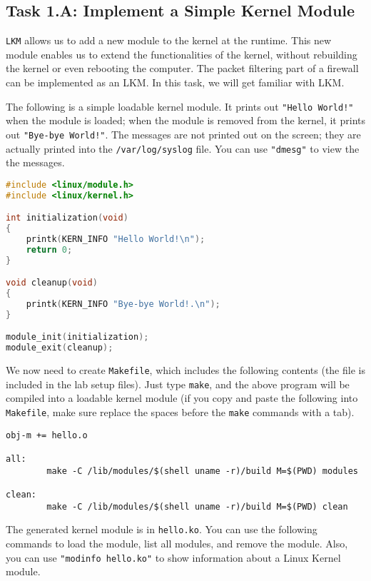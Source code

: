 \subsection{Task 1.A: Implement a Simple Kernel Module}


{\tt LKM} allows us to add a new module to the kernel at the runtime. 
This new module enables us to extend the functionalities of the kernel,
without rebuilding the kernel or even rebooting the computer. 
The packet filtering part of a firewall can be implemented as an LKM. 
In this task, we will get familiar with LKM.


The following is a simple loadable kernel module. It prints out 
\texttt{"Hello World!"} when the module is loaded; when the module
is removed from the kernel, it prints out \texttt{"Bye-bye World!"}.
The messages are not printed out on the screen; they are 
actually printed into the \texttt{/var/log/syslog} file. You can
use \texttt{"dmesg"} to view the the messages. 


\begin{lstlisting}[language=C, caption=\texttt{hello.c} (included in the lab setup files)]
#include <linux/module.h>
#include <linux/kernel.h>

int initialization(void)
{
    printk(KERN_INFO "Hello World!\n");
    return 0;
}

void cleanup(void)
{
    printk(KERN_INFO "Bye-bye World!.\n");
}

module_init(initialization);
module_exit(cleanup);
\end{lstlisting}

We now need to create {\tt Makefile}, which includes the following
contents (the file is included in the lab setup files). 
Just type {\tt make}, and the above program will be compiled
into a loadable kernel module (if you copy and paste the following
into \texttt{Makefile}, make sure replace the spaces before the 
\texttt{make} commands with a tab).

\begin{lstlisting}
obj-m += hello.o

all:
        make -C /lib/modules/$(shell uname -r)/build M=$(PWD) modules

clean:
        make -C /lib/modules/$(shell uname -r)/build M=$(PWD) clean
\end{lstlisting}


The generated kernel module is in \texttt{hello.ko}.  
You can use the following commands to 
load the module, list all modules, and remove the module. 
Also, you can use \texttt{"modinfo hello.ko"} to show information about a 
Linux Kernel module.

